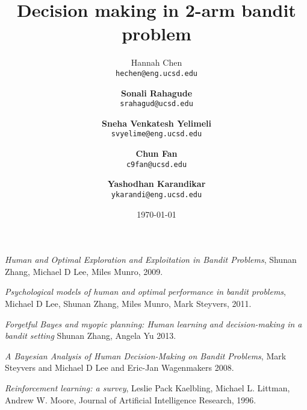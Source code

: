 \documentclass{article} %
\title{Decision making in 2-arm bandit problem}
\author{Hannah Chen \\
  \texttt{hechen@eng.ucsd.edu} \and \textbf{Sonali Rahagude}\\
  \texttt{srahagud@ucsd.edu} \and \textbf{Sneha Venkatesh Yelimeli}\\
  \texttt{svyelime@eng.ucsd.edu} \and \textbf{Chun Fan}\\
  \texttt{c9fan@ucsd.edu} \and \textbf{Yashodhan Karandikar}\\
  \texttt{ykarandi@eng.ucsd.edu}}
\date{\today}
\begin{document}
\maketitle



%




%

\begin{thebibliography}{9}

	\emph{Human and Optimal Exploration and Exploitation in Bandit Problems},
	Shunan Zhang, Michael D Lee, Miles Munro,
	2009.

  \emph{Psychological models of human and optimal performance in bandit problems},
  Michael D Lee, Shunan Zhang, Miles Munro, Mark Steyvers,
  2011.

 \emph{Forgetful Bayes and myopic planning: Human learning and decision-making in a bandit setting}
  Shunan Zhang, Angela Yu
  2013.

  \emph{A Bayesian Analysis of Human Decision-Making on Bandit Problems},
  Mark Steyvers and Michael D Lee and Eric-Jan Wagenmakers
  2008.
  
	\emph{Reinforcement learning: a survey},
	Leslie Pack	Kaelbling, Michael L. Littman, Andrew W. Moore,
	Journal of Artificial Intelligence Research,
	1996.

%
\end{thebibliography}
\end{document}
